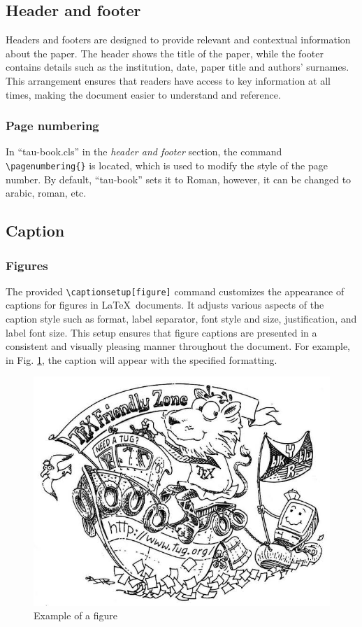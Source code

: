 \documentclass[10pt,a4paper,twoside]{tau-book}
\begin{document}
    \subsection{Header and footer}

        Headers and footers are designed to provide relevant and contextual information about the paper. The header shows the title of the paper, while the footer contains details such as the institution, date, paper title and authors' surnames. This arrangement ensures that readers have access to key information at all times, making the document easier to understand and reference.
    		
        \subsubsection{Page numbering}
    		
            In ``tau-book.cls'' in the \textit{header and footer} section, the command \verb*|\pagenumbering{}| is located, which is used to modify the style of the page number. By default, ``tau-book'' sets it to Roman, however, it can be changed to arabic, roman, etc.
        
    \subsection{Caption}

        \subsubsection{Figures}

            The provided \verb*|\captionsetup[figure]| command customizes the appearance of captions for figures in \LaTeX\ documents. It adjusts various aspects of the caption style such as format, label separator, font style and size, justification, and label font size. This setup ensures that figure captions are presented in a consistent and visually pleasing manner throughout the document. For example, in Fig. \ref{fig:enter-label}, the caption will appear with the specified formatting.
			
			\begin{figure}[H]
				\centering
				\includegraphics[width=0.8\columnwidth]{Figures/TeX.JPG}
				\caption{Example of a figure}
				\label{fig:enter-label}
			\end{figure}
\end{document}
